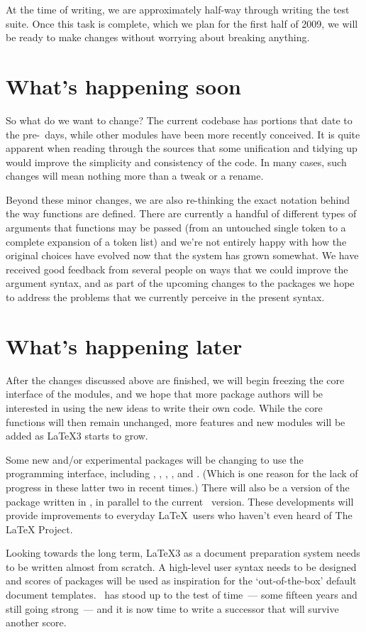 \documentclass{ltnews}
\begin{document}
At the time of writing, we are approximately half-way through writing the test
suite. Once this task is complete, which we plan for the first
half of 2009, we will be ready to make changes without worrying about breaking
anything.

\section{What's happening soon}

So what do we want to change? The current  codebase has
portions that date to the pre-\LaTeXe\ days, while other modules have been
more recently conceived. It is quite apparent when reading through the sources
that some unification and tidying up would improve the simplicity and
consistency of the code. In many cases, such changes will mean nothing more
than a tweak or a rename.

Beyond these minor changes, we are also re-thinking the exact notation behind
the way functions are defined. There are currently a handful of different
types of arguments that functions may be passed (from an untouched single
token to a complete expansion of a token list) and we're not entirely happy
with how the original choices have evolved now that the system has grown
somewhat. We have received good feedback from several people on ways that we
could improve the argument syntax, and as part of the upcoming changes to the
 packages we hope to address the problems that we currently
perceive in the present syntax.

\section{What's happening later}

After the changes discussed above are finished, we will begin freezing the core
interface of the  modules, and we hope that more package
authors will be interested in using the new ideas to write their own code.
While the core functions will then remain unchanged, more features and new
modules will be added as \LaTeX3 starts to grow.

Some new and/or experimental packages will be changing to use the
 programming interface, including ,
, , , and
. (Which is one reason for the lack of progress in
these latter two in recent times.) There will also be a version of the
 package written in , in parallel to the
current \LaTeXe\ version. These developments will provide improvements to
everyday \LaTeX\ users who haven't even heard of The \LaTeX{} Project.

Looking towards the long term, \LaTeX3 as a document preparation system needs
to be written almost from scratch. A high-level user syntax needs to be
designed and scores of packages will be used as inspiration for the
`out-of-the-box' default document templates. \LaTeXe\ has stood up to the test
of time~--- some fifteen years and still going strong~--- and it is now time
to write a successor that will survive another score.
\end{document}
